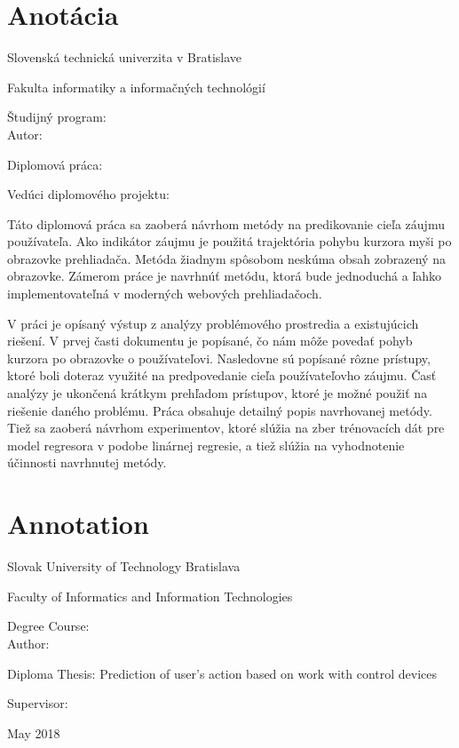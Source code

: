 \thispagestyle{empty}

\section*{Anotácia}

\begin{minipage}[t]{1\columnwidth}%
Slovenská technická univerzita v Bratislave

Fakulta informatiky a informačných technológií

Študijný program: \myStudyProgram\\

Autor: \myName

Diplomová práca: \myTitle

Vedúci diplomového projektu: \mySupervisor

\myDate%
\end{minipage}

\bigskip{}

Táto diplomová práca sa zaoberá návrhom metódy na predikovanie cieľa záujmu používateľa. Ako indikátor záujmu je použitá trajektória pohybu kurzora myši po obrazovke prehliadača. Metóda žiadnym spôsobom neskúma obsah zobrazený na obrazovke. Zámerom práce je navrhnúť metódu, ktorá bude jednoduchá a ľahko implementovateľná v moderných webových prehliadačoch.

V práci je opísaný výstup z analýzy problémového prostredia a existujúcich riešení. V prvej časti dokumentu je popísané, čo nám môže povedať pohyb kurzora po obrazovke o používateľovi. Nasledovne sú popísané rôzne prístupy, ktoré boli doteraz využité na predpovedanie cieľa používateľovho záujmu. Časť analýzy je ukončená krátkym prehľadom prístupov, ktoré je možné použiť na riešenie daného problému. Práca obsahuje detailný popis navrhovanej metódy. Tiež sa zaoberá návrhom experimentov, ktoré slúžia na zber trénovacích dát pre model regresora v podobe linárnej regresie, a tiež slúžia na vyhodnotenie účinnosti navrhnutej metódy.


\newpage{}\thispagestyle{empty}

\newpage
\thispagestyle{empty}
\mbox{}
\newpage

\thispagestyle{empty}

\section*{Annotation}

\begin{minipage}[t]{1\columnwidth}%
Slovak University of Technology Bratislava 

Faculty of Informatics and Information Technologies

Degree Course: \myStudyProgram\\

Author: \myName

Diploma Thesis: Prediction of user's action based on work with control devices

Supervisor: \mySupervisor

May 2018
\end{minipage}

